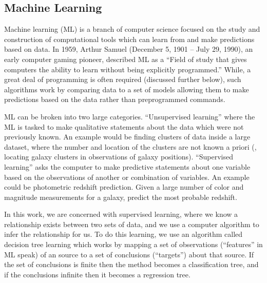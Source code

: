 \subsection{Machine Learning}
Machine learning (ML) is a branch of computer science focused on the study and construction of computational tools which can learn from and make predictions based on data. In 1959, Arthur Samuel (December 5, 1901 -- July 29, 1990), an early computer gaming pioneer, described ML as a ``Field of study that gives computers the ability to learn without being explicitly programmed.'' While, a great deal of programming is often required (discussed further below), such algorithms work by comparing data to a set of models allowing them to make predictions based on the data rather than preprogrammed commands.

ML can be broken into two large categories. ``Unsupervised learning'' where the ML is tasked to make qualitative statements about the data which were not previously known. An example would be finding clusters of data inside a large dataset, where the number and location of the clusters are not known a priori (\eg, locating galaxy clusters in observations of galaxy positions). ``Supervised learning'' asks the computer to make predictive statements about one variable based on the observations of another or combination of variables. An example could be photometric redshift prediction. Given a large number of color and magnitude measurements for a galaxy, predict the most probable redshift.  

In this work, we are concerned with supervised learning, where we know a relationship exists between two sets of data, and we use a computer algorithm to infer the relationship for us. To do this learning, we use an algorithm called decision tree learning which works by mapping a set of observations (``features'' in ML speak) of an source to a set of conclusions (``targets'') about that source. If the set of conclusions is finite then the method becomes a classification tree, and if the conclusions infinite then it becomes a regression tree. 

